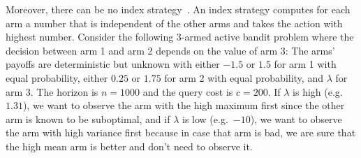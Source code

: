 \documentclass[a4paper]{article}
\begin{document}
Moreover, there can be no index strategy~\citep[Ex.~4]{Hay12}.
An index strategy computes for each arm
a number that is independent of the other arms
and takes the action with highest number.
Consider the following 3-armed active bandit problem
where the decision between arm 1 and arm 2 depends
on the value of arm 3:
The arms' payoffs are deterministic but unknown with
either $-1.5$ or $1.5$ for arm 1 with equal probability,
either $0.25$ or $1.75$ for arm 2 with equal probability, and
$\lambda$ for arm 3.
The horizon is $n = 1000$
and the query cost is $c = 200$.
If $\lambda$ is high (e.g.\ $1.31$),
we want to observe the arm with the high maximum first
since the other arm is known to be suboptimal, and
if $\lambda$ is low (e.g.\ $-10$),
we want to observe the arm with high variance first
because in case that arm is bad, we are sure that
the high mean arm is better and don't need to observe it.

\end{document}
